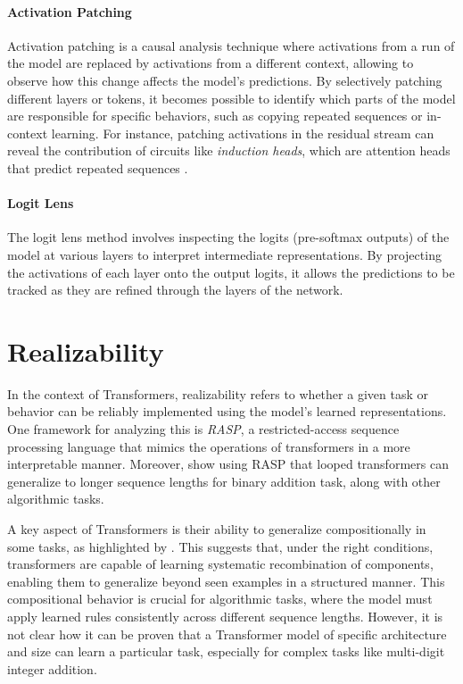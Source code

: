 \paragraph{Activation Patching}
Activation patching \parencite{zhang_towards_2023} is a causal analysis technique where activations from a run of the model are replaced by activations from a different context, allowing to observe how this change affects the model's predictions. By selectively patching different layers or tokens, it becomes possible to identify which parts of the model are responsible for specific behaviors, such as copying repeated sequences or in-context learning. For instance, patching activations in the residual stream can reveal the contribution of circuits like \emph{induction heads}, which are attention heads that predict repeated sequences \parencite{olsson_-context_2022}.

\paragraph{Logit Lens}
The logit lens method \parencite{nostalgebraist_interpreting_2020} involves inspecting the logits (pre-softmax outputs) of the model at various layers to interpret intermediate representations. By projecting the activations of each layer onto the output logits, it allows the predictions to be tracked as they are refined through the layers of the network.

\section{Realizability}\label{sec:realizability}

In the context of Transformers, realizability refers to whether a given task or behavior can be reliably implemented using the model's learned representations. One framework for analyzing this is \emph{RASP}, a restricted-access sequence processing language \parencite{weiss_thinking_2021} that mimics the operations of transformers in a more interpretable manner. Moreover, \cite{fan_looped_2024} show using RASP that looped transformers can generalize to longer sequence lengths for binary addition task, along with other algorithmic tasks.

A key aspect of Transformers is their ability to generalize compositionally in some tasks, as highlighted by \cite{hupkes_compositionality_2020}. This suggests that, under the right conditions, transformers are capable of learning systematic recombination of components, enabling them to generalize beyond seen examples in a structured manner. This compositional behavior is crucial for algorithmic tasks, where the model must apply learned rules consistently across different sequence lengths. However, it is not clear how it can be proven that a Transformer model of specific architecture and size can learn a particular task, especially for complex tasks like multi-digit integer addition.


